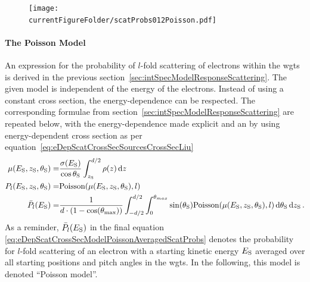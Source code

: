 \begin{figure}[th]
\texttt{[image: \\currentFigureFolder/scatProbs012Poisson.pdf]}
        \label{fig:eDepScatCrossSecModel}
\end{figure}

\paragraph{The Poisson Model}
An expression for the probability of $l$-fold scattering of electrons within the \gls{wgts} is derived in the previous section~\ref{sec:intSpecModelResponseScattering}. The given model is independent of the energy of the electrons. Instead of using a constant cross section, the energy-dependence can be respected. The corresponding formulae from section~\ref{sec:intSpecModelResponseScattering} are repeated below, with the energy-dependence made explicit and an by using energy-dependent cross section as per equation~\eqref{eq:eDepScatCrossSecSourcesCrossSecLiu}
\begin{subequations}
\label{eq:eDepScatCrossSecModelPoisson}
\begin{align}
    \mu(E_\mathrm{S},z_\mathrm{S},\theta_\mathrm{S}) =&
    \frac{\sigma(E_\mathrm{S})}{\cos\theta_\mathrm{S}}
    \int_{z_\mathrm{S}}^{d/2} \rho(z)\mathop{}\!\mathrm{d} z \label{eq:energydepScatProbsPoissonExpectedScatCount} \\
    P_l(E_\mathrm{S},z_\mathrm{S},\theta_\mathrm{S}) =&
    \mathrm{Poisson}(\mu(E_\mathrm{S},z_\mathrm{S},\theta_\mathrm{S}),l) \label{eq:eDepScatCrossSecModelPoissonNonAveragedScatProbs} \\
    \bar{P}_l(E_\mathrm{S}) =&
    \frac{1}{d \cdot (1-\cos(\theta_\mathrm{max}))} 
      \int_{-d/2}^{d/2}  
          \int_{0}^{\theta_{max}} 
            \sin(\theta_\mathrm{S})
            \mathrm{Poisson}(\mu(E_\mathrm{S},z_\mathrm{S},\theta_\mathrm{S}),l)
          \mathop{}\!\mathrm{d}\theta_\mathrm{S}
      \mathop{}\!\mathrm{d}z_\mathrm{S}
      \label{eq:eDepScatCrossSecModelPoissonAveragedScatProbs}
    \text{\,.}
\end{align}
\end{subequations}
As a reminder, $\bar{P}_l(E_\mathrm{S})$ in the final equation \eqref{eq:eDepScatCrossSecModelPoissonAveragedScatProbs} denotes the probability for $l$-fold scattering of an electron with a starting kinetic energy $E_\mathrm{S}$ averaged over all starting positions and pitch angles in the \gls{wgts}. In the following, this model is denoted ``Poisson model''. 

